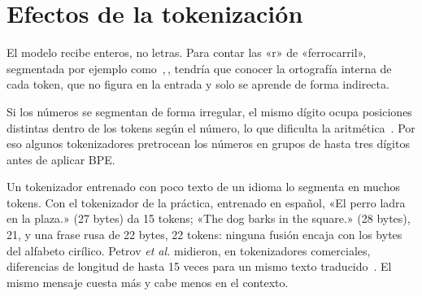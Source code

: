 \section{Efectos de la tokenización}

\begin{observacion}[Letras]
El modelo recibe enteros, no letras. Para contar las «r» de «ferrocarril», segmentada por ejemplo como \,\sep{}\,, tendría que conocer la ortografía interna de cada token, que no figura en la entrada y solo se aprende de forma indirecta.
\end{observacion}

\begin{observacion}[Números]
Si los números se segmentan de forma irregular, el mismo dígito ocupa posiciones distintas dentro de los tokens según el número, lo que dificulta la aritmética~\cite[ejercicio~2.2]{jm3}. Por eso algunos tokenizadores pretrocean los números en grupos de hasta tres dígitos antes de aplicar BPE.
\end{observacion}

\begin{observacion}[Idiomas]
Un tokenizador entrenado con poco texto de un idioma lo segmenta en muchos tokens. Con el tokenizador de la práctica, entrenado en español, «El perro ladra en la plaza.» (27 bytes) da 15 tokens; «The dog barks in the square.» (28 bytes), 21, y una frase rusa de 22 bytes, 22 tokens: ninguna fusión encaja con los bytes del alfabeto cirílico. Petrov \emph{et al.} midieron, en tokenizadores comerciales, diferencias de longitud de hasta 15 veces para un mismo texto traducido~\cite{petrov}. El mismo mensaje cuesta más y cabe menos en el contexto.
\end{observacion}

